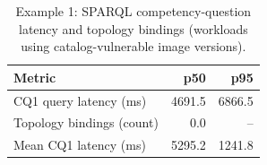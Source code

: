 \begin{table}[htbp]
\centering
\caption{Example 1: SPARQL competency-question latency and topology bindings (workloads using catalog-vulnerable image versions).}
\label{tab:paper_e1_sparql}
\begin{tabular}{lrr}
\toprule
\textbf{Metric} & \textbf{p50} & \textbf{p95} \\
\midrule
CQ1 query latency (ms) & 4691.5 & 6866.5 \\
Topology bindings (count) & 0.0 & -- \\
Mean CQ1 latency (ms) & 5295.2 & 1241.8 \\
\bottomrule
\end{tabular}
\end{table}
